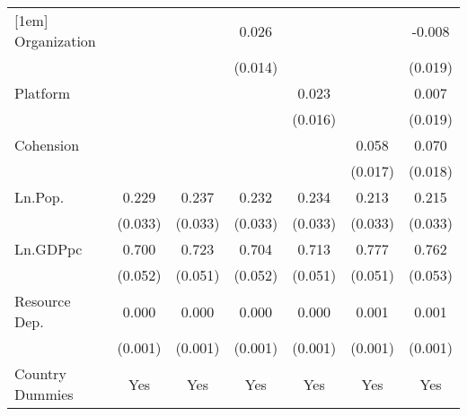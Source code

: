 \begin{table}[htbp]
{\begin{tabular}{l*{6}{c}}
			[1em]
			Organization        &                     &                     &       0.026         &                     &                     &      -0.008         \\
			                    &                     &                     &     (0.014)         &                     &                     &     (0.019)         \\
			[1em]
			Platform            &                     &                     &                     &       0.023         &                     &       0.007         \\
			                    &                     &                     &                     &     (0.016)         &                     &     (0.019)         \\
			[1em]
			Cohension           &                     &                     &                     &                     &       0.058\sym{***}&       0.070\sym{***}\\
			                    &                     &                     &                     &                     &     (0.017)         &     (0.018)         \\
			[1em]
			Ln.Pop.             &       0.229\sym{***}&       0.237\sym{***}&       0.232\sym{***}&       0.234\sym{***}&       0.213\sym{***}&       0.215\sym{***}\\
			                    &     (0.033)         &     (0.033)         &     (0.033)         &     (0.033)         &     (0.033)         &     (0.033)         \\
			[1em]
			Ln.GDPpc            &       0.700\sym{***}&       0.723\sym{***}&       0.704\sym{***}&       0.713\sym{***}&       0.777\sym{***}&       0.762\sym{***}\\
			                    &     (0.052)         &     (0.051)         &     (0.052)         &     (0.051)         &     (0.051)         &     (0.053)         \\
			[1em]
			Resource Dep.       &       0.000         &       0.000         &       0.000         &       0.000         &       0.001         &       0.001         \\
			                    &     (0.001)         &     (0.001)         &     (0.001)         &     (0.001)         &     (0.001)         &     (0.001)         \\
			[1em]
			Country Dummies     &         Yes         &         Yes         &         Yes         &         Yes         &         Yes         &         Yes         \\

\end{tabular}}
\end{table}
